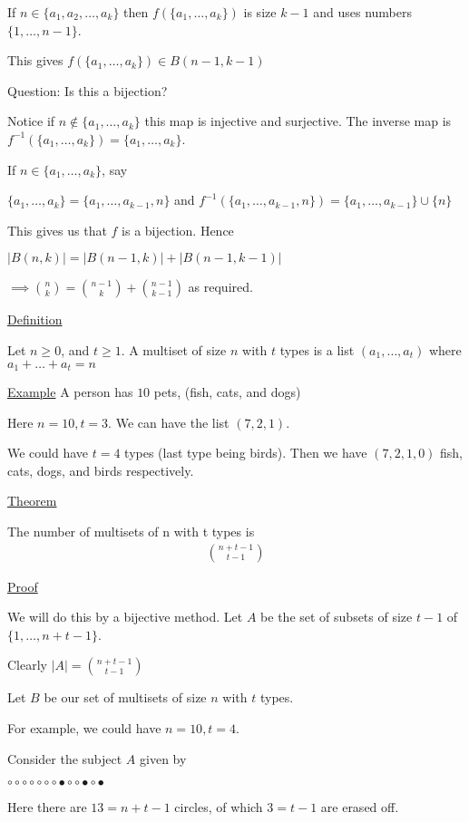 \documentclass{article}
\begin{document}
If $n \in \{a_1,a_2,\ldots,a_k\}$ then $f(\{a_1,\ldots,a_k\})$ is size $k-1$ and uses numbers $\{1,\ldots,n-1\}$. 

This gives $f(\{a_1,\ldots,a_k\}) \in B(n-1,k-1)$

Question: Is this a bijection? 

Notice if $n \notin \{a_1,\ldots,a_k\}$ this map is injective and surjective. The inverse map is $f^{-1}(\{a_1,\ldots,a_k\}) = \{a_1,\ldots,a_k\}$.

If $n \in \{a_1, \ldots, a_k\}$, say 

$\{a_1,\ldots,a_k\} = \{a_1,\ldots,a_{k-1}, n\}$ and $f^{-1}(\{a_1,\ldots, a_{k-1}, n\}) = \{a_1, \ldots, a_{k-1}\} \cup \{n\}$

This gives us that $f$ is a bijection. Hence

$|B(n,k)| = |B(n-1, k)| + |B(n-1, k-1)|$

$\implies \binom{n}{k} = \binom{n-1}{k} + \binom{n-1}{k-1}$ as required. 

\underline{Definition}

Let $n \ge 0 $, and $t \ge 1$. A multiset of size $n$ with $t$ types is a list $(a_1, \ldots, a_t)$ where $a_1 + \ldots + a_t = n$

\underline{Example} A person has $10$ pets, (fish, cats, and dogs)

Here $n=10, t=3$. We can have the list $(7,2,1)$.

We could have $t=4$ types (last type being birds). Then we have $(7,2,1,0)$ fish, cats, dogs, and birds respectively. 

\underline{Theorem}

The number of multisets of n with t types is 
\begin{align*}
    \binom{n+t-1}{t-1}
\end{align*}

\underline{Proof}

We will do this by a bijective method. Let $A$ be the set of subsets of size $t-1$ of $\{1,\ldots,n+t-1\}$. 

Clearly $|A| = \binom{n+t-1}{t-1}$

Let $B$ be our set of multisets of size $n$ with $t$ types. 

For example, we could have $n=10, t=4$.

Consider the subject $A$ given by

$\circ \circ \circ \circ \circ \circ \circ \bullet \circ \circ \bullet \circ \bullet$

Here there are $13 = n+t-1$ circles, of which $3=t-1$ are erased off. 
\end{document}
